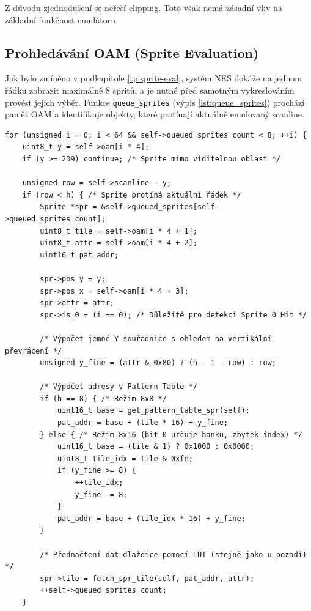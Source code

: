 Z důvodu zjednodušení se neřeší clipping. Toto však nemá zásadní vliv na základní funkčnost
emulátoru.

\subsection{Prohledávání OAM (Sprite Evaluation)}

Jak bylo zmíněno v podkapitole \ref{tp:sprite-eval}, systém NES dokáže na jednom řádku zobrazit
maximálně 8 spritů, a je nutné před samotným vykreslováním provést jejich výběr. Funkce
\texttt{queue\_sprites} (výpis \ref{lst:queue_sprites}) prochází paměť OAM a identifikuje objekty,
které protínají aktuálně emulovaný scanline.

\begin{listing}[htbp]
\begin{verbatim}
for (unsigned i = 0; i < 64 && self->queued_sprites_count < 8; ++i) {
    uint8_t y = self->oam[i * 4];
    if (y >= 239) continue; /* Sprite mimo viditelnou oblast */

    unsigned row = self->scanline - y;
    if (row < h) { /* Sprite protíná aktuální řádek */
        Sprite *spr = &self->queued_sprites[self->queued_sprites_count];
        uint8_t tile = self->oam[i * 4 + 1];
        uint8_t attr = self->oam[i * 4 + 2];
        uint16_t pat_addr;

        spr->pos_y = y;
        spr->pos_x = self->oam[i * 4 + 3];
        spr->attr = attr;
        spr->is_0 = (i == 0); /* Důležité pro detekci Sprite 0 Hit */

        /* Výpočet jemné Y souřadnice s ohledem na vertikální převrácení */
        unsigned y_fine = (attr & 0x80) ? (h - 1 - row) : row;

        /* Výpočet adresy v Pattern Table */
        if (h == 8) { /* Režim 8x8 */
            uint16_t base = get_pattern_table_spr(self);
            pat_addr = base + (tile * 16) + y_fine;
        } else { /* Režim 8x16 (bit 0 určuje banku, zbytek index) */
            uint16_t base = (tile & 1) ? 0x1000 : 0x0000;
            uint8_t tile_idx = tile & 0xfe;
            if (y_fine >= 8) {
                ++tile_idx;
                y_fine -= 8;
            }
            pat_addr = base + (tile_idx * 16) + y_fine;
        }

        /* Přednačtení dat dlaždice pomocí LUT (stejně jako u pozadí) */
        spr->tile = fetch_spr_tile(self, pat_addr, attr);
        ++self->queued_sprites_count;
    }
\end{verbatim}
\caption{Implementace Sprite Evaluation. Funkce připravuje data pro 8 objektů na aktuálním řádku.}
\label{lst:queue_sprites}
\end{listing}

